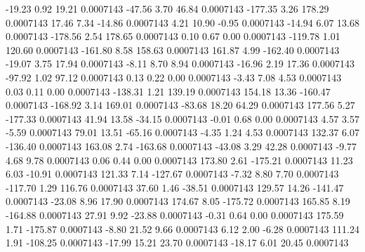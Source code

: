       -19.23        0.92       19.21     0.0007143
      -47.56        3.70       46.84     0.0007143
     -177.35        3.26      178.29     0.0007143
       17.46        7.34      -14.86     0.0007143
        4.21       10.90       -0.95     0.0007143
      -14.94        6.07       13.68     0.0007143
     -178.56        2.54      178.65     0.0007143
        0.10        0.67        0.00     0.0007143
     -119.78        1.01      120.60     0.0007143
     -161.80        8.58      158.63     0.0007143
      161.87        4.99     -162.40     0.0007143
      -19.07        3.75       17.94     0.0007143
       -8.11        8.70        8.94     0.0007143
      -16.96        2.19       17.36     0.0007143
      -97.92        1.02       97.12     0.0007143
        0.13        0.22        0.00     0.0007143
       -3.43        7.08        4.53     0.0007143
        0.03        0.11        0.00     0.0007143
     -138.31        1.21      139.19     0.0007143
      154.18       13.36     -160.47     0.0007143
     -168.92        3.14      169.01     0.0007143
      -83.68       18.20       64.29     0.0007143
      177.56        5.27     -177.33     0.0007143
       41.94       13.58      -34.15     0.0007143
       -0.01        0.68        0.00     0.0007143
        4.57        3.57       -5.59     0.0007143
       79.01       13.51      -65.16     0.0007143
       -4.35        1.24        4.53     0.0007143
      132.37        6.07     -136.40     0.0007143
      163.08        2.74     -163.68     0.0007143
      -43.08        3.29       42.28     0.0007143
       -9.77        4.68        9.78     0.0007143
        0.06        0.44        0.00     0.0007143
      173.80        2.61     -175.21     0.0007143
       11.23        6.03      -10.91     0.0007143
      121.33        7.14     -127.67     0.0007143
       -7.32        8.80        7.70     0.0007143
     -117.70        1.29      116.76     0.0007143
       37.60        1.46      -38.51     0.0007143
      129.57       14.26     -141.47     0.0007143
      -23.08        8.96       17.90     0.0007143
      174.67        8.05     -175.72     0.0007143
      165.85        8.19     -164.88     0.0007143
       27.91        9.92      -23.88     0.0007143
       -0.31        0.64        0.00     0.0007143
      175.59        1.71     -175.87     0.0007143
       -8.80       21.52        9.66     0.0007143
        6.12        2.00       -6.28     0.0007143
      111.24        1.91     -108.25     0.0007143
      -17.99       15.21       23.70     0.0007143
      -18.17        6.01       20.45     0.0007143
